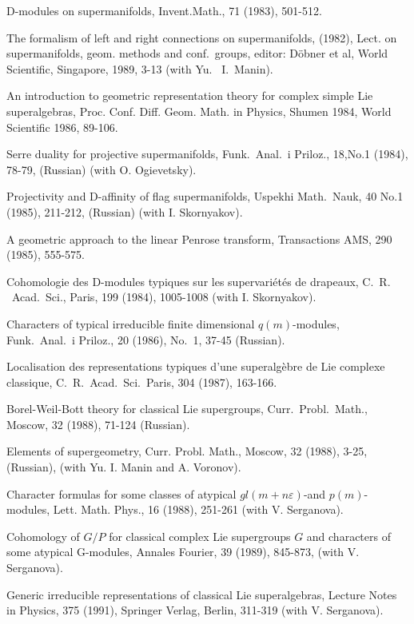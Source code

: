 \documentclass[11pt]{amsart}
\begin{document}
\myss \label{4.} D-modules on supermanifolds, Invent.Math., 71
(1983), 501-512.

\myss \label{5.} The formalism of left and right connections on
supermanifolds, (1982), Lect. on supermanifolds, geom. methods and
conf.~groups, editor: D\"obner et al, World Scientific, Singapore,
1989, 3-13 (with Yu.~ I.~Manin).

\myss \label{6.} An introduction to geometric representation
theory for complex simple Lie superalgebras, Proc. Conf. Diff.
Geom. Math. in Physics, Shumen 1984, World Scientific 1986,
89-106.

\myss \label{7.} Serre duality for projective supermanifolds,
Funk.~Anal.~i Priloz., 18,No.1 (1984), 78-79, (Russian) (with O.
Ogievetsky).

\myss \label{8.} Projectivity and D-affinity of flag
supermanifolds, Uspekhi Math.~Nauk, 40 No.1 (1985), 211-212,
(Russian) (with I. Skornyakov).

\myss \label{9.} A geometric approach to the linear Penrose
transform, Transactions AMS, 290 (1985), 555-575.

\myss \label{10.} Cohomologie des D-modules typiques sur les
supervari\'et\'es de drapeaux, C.~R.\- ~Acad.~Sci., Paris, 199
(1984), 1005-1008 (with I. Skornyakov).

\myss \label{11.} Characters of typical irreducible finite
dimensional $q(m)$-modules, Funk.~Anal.~i Priloz., 20 (1986),
No.~1, 37-45 (Russian).

\myss \label{12.} Localisation des representations typiques d'une
superalg\`ebre de Lie complexe classique, C.~R.~Acad.~Sci.~Paris,
304 (1987), 163-166.

\myss \label{13.} Borel-Weil-Bott theory for classical Lie
supergroups, Curr.~Probl.~Math., Moscow, 32 (1988), 71-124
(Russian).

\myss \label{14.} Elements of supergeometry, Curr. Probl. Math.,
Moscow, 32 (1988), 3-25, (Russian), (with Yu. I. Manin and A.
Voronov).

\myss \label{15.} Character formulas for some classes of atypical
$gl(m+n\varepsilon)$-and $p(m)$-modules, Lett. Math. Phys., 16
(1988), 251-261 (with V. Serganova).

\myss \label{16.} Cohomology of $G/P$ for classical complex Lie
supergroups $G$ and characters of some atypical G-modules, Annales
Fourier, 39 (1989), 845-873, (with V. Serganova).

\myss \label{17.}  Generic irreducible representations of
classical Lie superalgebras, Lecture Notes in Physics, 375 (1991),
Springer Verlag, Berlin, 311-319 (with V. Serga\-nova).
\end{document}
